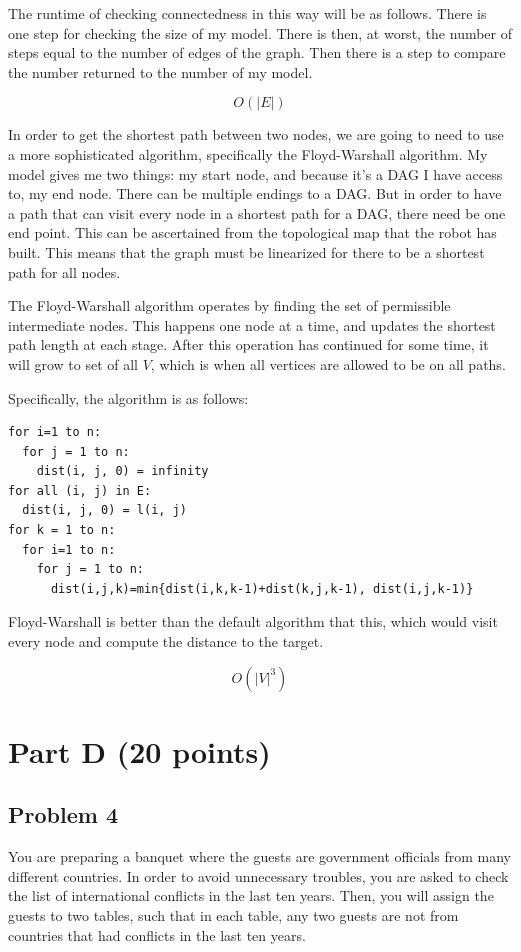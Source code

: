 \documentclass[11pt]{article}
\begin{document}
The runtime of checking connectedness in this way will be as follows. There
is one step for checking the size of my model. There is then, at worst, 
the number of steps equal to the number of edges of the graph. Then there is
a step to compare the number returned to the number of my model.

$$O(|E|)$$

In order to get the shortest path between two nodes, we are going to
need to use a more sophisticated algorithm, specifically the Floyd-Warshall algorithm. My model gives me two things: my start node, and because it's
a DAG I have access to, my end node. There can be multiple endings to a
DAG. But in order to have a path that can visit every node in a shortest
path for a DAG, there need be one end point. This can be ascertained from the
topological map that the robot has built. This means that the graph must
be linearized for there to be a shortest path for all nodes.

The Floyd-Warshall algorithm operates by finding the set of permissible
intermediate nodes. This happens one node at a time, and updates
the shortest path length at each stage. After this operation has
continued for some time, it will grow to set of all $V$, which is
when all vertices are allowed to be on all paths.

Specifically, the algorithm is as follows:

\begin{verbatim}
for i=1 to n: 
  for j = 1 to n:
    dist(i, j, 0) = infinity 
for all (i, j) in E:
  dist(i, j, 0) = l(i, j) 
for k = 1 to n:
  for i=1 to n: 
    for j = 1 to n:
      dist(i,j,k)=min{dist(i,k,k-1)+dist(k,j,k-1), dist(i,j,k-1)}
\end{verbatim}

Floyd-Warshall is better than the default algorithm that this, which would
visit every node and compute the distance to the target.

$$O(|V|^3)$$

\section*{Part D (20 points)}

\subsection*{Problem 4} You are preparing a banquet where the
guests are government officials from many different countries. In
order to avoid unnecessary troubles, you are asked to check the list
of international conflicts in the last ten years. Then, you will
assign the guests to two tables, such that in each table, any two
guests are not from countries that had conflicts in the last ten
years.\\
\end{document}
